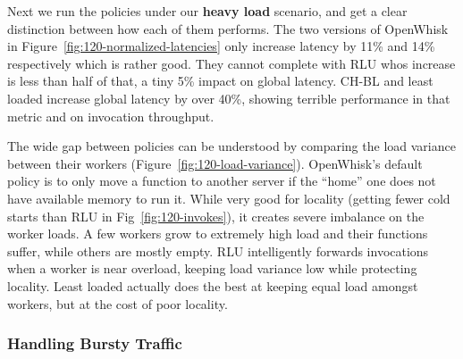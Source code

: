 Next we run the policies under our \textbf{heavy load} scenario, and get a clear distinction between how each of them performs. 
The two versions of OpenWhisk  in Figure~\ref{fig:120-normalized-latencies} only increase latency by 11\% and 14\% respectively which is rather good.
They cannot complete with RLU whos increase is less than half of that, a tiny 5\% impact on global latency.
CH-BL and least loaded increase global latency by over 40\%, showing terrible performance in that metric and on invocation throughput. 


The wide gap between policies can be understood by comparing the load variance between their workers (Figure~\ref{fig:120-load-variance}).
OpenWhisk's default policy is to only move a function to another server if the ``home'' one does not have available memory to run it. 
While very good for locality (getting fewer cold starts than RLU in Fig~\ref{fig:120-invokes}), it creates severe imbalance on the worker loads.
A few workers grow to extremely high load and their functions suffer, while others are mostly empty. 
RLU intelligently forwards invocations when a worker is near overload, keeping load variance low while protecting locality. 
Least loaded actually does the best at keeping equal load amongst workers, but at the cost of poor locality.


\subsubsection{Handling Bursty Traffic}



